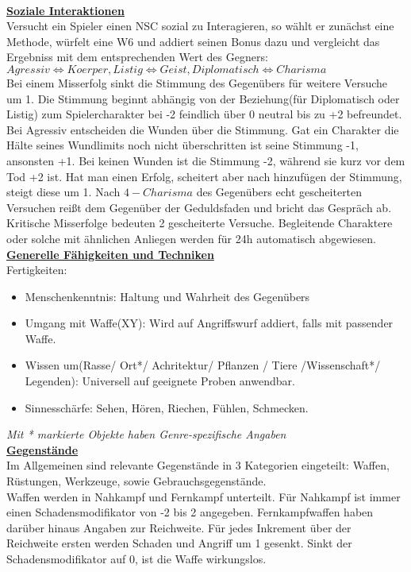 \documentclass[twoside,a4paper]{minimal}
\begin{document}
\begin{multicols*}{3}
\textbf{\uline{\\Soziale Interaktionen}}
\\Versucht ein Spieler einen NSC sozial zu Interagieren, so wählt er zunächst eine Methode, würfelt eine W6 und addiert seinen Bonus dazu und vergleicht das Ergebniss mit dem entsprechenden Wert des Gegners:
\\$Agressiv\iff Koerper,Listig\iff Geist,Diplomatisch\iff Charisma$
\\Bei einem Misserfolg sinkt die Stimmung des Gegenübers für weitere Versuche um 1. Die Stimmung beginnt abhängig von der Beziehung(für Diplomatisch oder Listig) zum Spielercharakter bei -2 feindlich über 0 neutral bis zu +2 befreundet. Bei Agressiv entscheiden die Wunden über die Stimmung. Gat ein Charakter die Hälte seines Wundlimits noch nicht überschritten ist seine Stimmung -1, ansonsten +1. Bei keinen Wunden ist die Stimmung -2, während sie kurz vor dem Tod +2 ist. Hat man einen Erfolg, scheitert aber nach hinzufügen der Stimmung, steigt diese um 1. Nach $4-Charisma$ des Gegenübers echt gescheiterten Versuchen reißt dem Gegenüber der Geduldsfaden und bricht das Gespräch ab. Kritische Misserfolge bedeuten 2 gescheiterte Versuche. Begleitende Charaktere oder solche mit ähnlichen Anliegen werden für 24h automatisch abgewiesen.
\textbf{\uline{\\Generelle Fähigkeiten und Techniken}}
\\Fertigkeiten: 
\begin{itemize}
\item Menschenkenntnis: Haltung und Wahrheit des Gegenübers
\item Umgang mit Waffe(XY): Wird auf Angriffswurf addiert, falls mit passender Waffe.
\item Wissen um(Rasse/ Ort*/ Achritektur/ Pflanzen / Tiere /Wissenschaft*/ Legenden): Universell auf geeignete Proben anwendbar.
\item Sinnesschärfe: Sehen, Hören, Riechen, Fühlen, Schmecken.
\end{itemize}
\textit{Mit * markierte Objekte haben Genre-spezifische Angaben}
\textbf{\uline{\\Gegenstände}}
\\Im Allgemeinen sind relevante Gegenstände in 3 Kategorien eingeteilt: Waffen, Rüstungen, Werkzeuge, sowie Gebrauchsgegenstände.
\\Waffen werden in Nahkampf und Fernkampf unterteilt. Für Nahkampf ist immer einen Schadensmodifikator von -2 bis 2 angegeben. Fernkampfwaffen haben darüber hinaus Angaben zur Reichweite. Für jedes Inkrement über der Reichweite ersten werden Schaden und Angriff um 1 gesenkt. Sinkt der Schadensmodifikator auf 0, ist die Waffe wirkungslos.

\end{multicols*}
\end{document}
